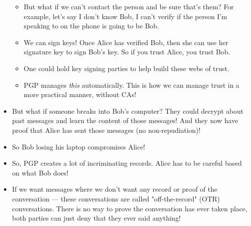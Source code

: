 \documentclass{article}
\begin{document}
\begin{itemize}
\begin{itemize}
            \item But what if we can't contact the person and be sure that's them?  For example, let's say I don't know Bob, I can't verify if the person I'm speaking to on the phone is going to be Bob.
            \item We can sign keys!  Once Alice has verified Bob, then she can use her signature key to sign Bob's key.  So if you trust Alice, you trust Bob.
            \item One could hold key signing parties to help build these webs of trust.
            \item PGP manages \emph{this} automatically.  This is how we can manage trust in a more practical manner, without CAs!
        \end{itemize}
    \item But what if someone breaks into Bob's computer?  They could decrypt about past messages and learn the content of those messages!  And they now have proof that Alice has sent those messages (no non-repudiation)!
    \item So Bob losing his laptop compromises Alice!
    \item So, PGP creates a lot of incriminating records.  Alice has to be careful based on what Bob does!
    \item If we want messages where we don't want any record or proof of the conversation --- these conversations are called "off-the-record" (OTR) conversations.  There is no way to prove the conversation has ever taken place, both parties can just deny that they ever said anything!
\end{itemize}
\end{document}
